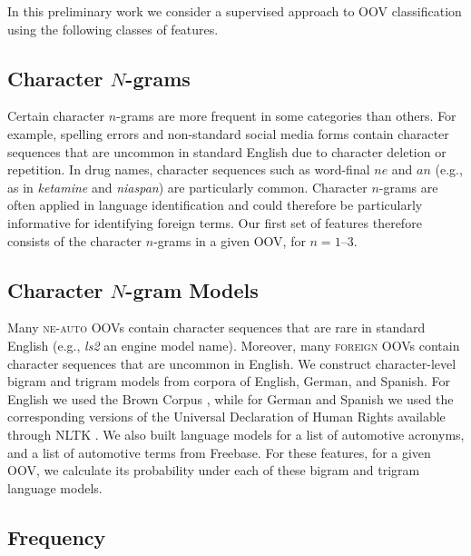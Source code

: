 \documentclass[10pt, a4paper]{article}
\begin{document}

In this preliminary work we consider a supervised approach to OOV
classification using the following classes of features.

\subsection{Character $N$-grams}

Certain character $n$-grams are more frequent in some categories than
others. For example, spelling errors and non-standard social media
forms contain character sequences that are uncommon in standard
English due to character deletion or repetition. In drug names,
character sequences such as word-final $ne$ and $an$ (e.g., as in
\emph{ketamine} and \emph{niaspan}) are particularly common. Character
$n$-grams are often applied in language identification \cite[for
  example]{LuiBaldwin2011} and could therefore be particularly
informative for identifying foreign terms. Our first set of features
therefore consists of the character $n$-grams in a given OOV, for $n =
1$--$3$.

\subsection{Character $N$-gram Models}

Many \textsc{ne-auto} OOVs contain character sequences that are rare
in standard English (e.g., \emph{ls2} an engine model name). Moreover,
many \textsc{foreign} OOVs contain character sequences that are
uncommon in English. We construct character-level bigram and trigram
models from corpora of English, German, and Spanish. For English we
used the Brown Corpus \cite{Francis1979}, while for German and Spanish
we used the corresponding versions of the Universal Declaration of
Human Rights available through NLTK \cite{Bird2009}. We also built
language models for a list of automotive acronyms, and a list of
automotive terms from Freebase. For these features, for a given OOV,
we calculate its probability under each of these bigram and trigram
language models.


\subsection{Frequency\label{sec:features:frequency}}
\end{document}
